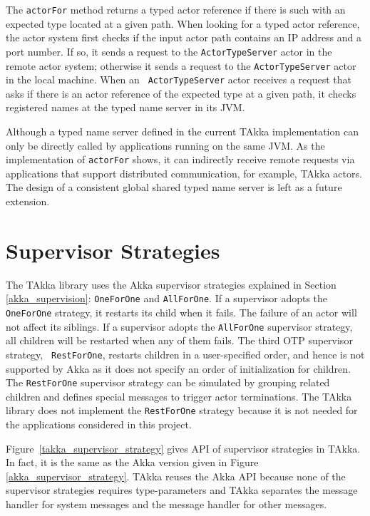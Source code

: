The {\tt actorFor} method returns a typed actor reference if there is such with 
an expected type located at a given path.  When looking for a typed 
actor reference, the actor system first checks if the input actor path 
contains an IP address and a port number.  If so, it sends a request to the 
{\tt ActorTypeServer} actor in the remote actor system; otherwise it sends a 
request to the {\tt ActorTypeServer} actor in the local machine.  When an {\tt 
ActorTypeServer} actor receives a request that asks if there is an actor 
reference of the expected type at a given path,
it checks registered names at the typed name server in its JVM.  


Although a typed name server defined in the current TAkka implementation can 
only be directly called by applications running on the same JVM.  As the 
implementation of {\tt actorFor} shows, it can indirectly receive remote 
requests via applications that support distributed communication, for example, 
TAkka actors.  The design of a consistent global shared typed name server is 
left as a future extension.



\section{Supervisor Strategies}
\label{supervision}

The TAkka library uses the Akka supervisor strategies explained in Section 
\ref{akka_supervision}: {\tt OneForOne} and {\tt AllForOne}.  If a supervisor 
adopts the {\tt OneForOne} strategy, it restarts its child when it fails.  
The failure of an actor will not affect its siblings.  If a supervisor adopts 
the {\tt AllForOne} supervisor strategy, all children will 
be restarted when any of them fails.  The third OTP supervisor strategy, {\tt
RestForOne}, restarts children in a user-specified order, and hence is not
supported by Akka as it does not specify an order of initialization for
children.  The {\tt RestForOne} supervisor strategy can be simulated by 
grouping related children and defines special messages to trigger actor 
terminations.  The TAkka library does not implement the {\tt RestForOne} 
strategy because it is not needed for the applications considered in this 
project.

Figure~\ref{takka_supervisor_strategy} gives API of supervisor strategies in 
TAkka.  In fact, it is the same as the Akka version given in Figure 
\ref{akka_supervisor_strategy}.  TAkka reuses the Akka API because none of the 
supervisor strategies requires type-parameters and TAkka separates 
the message handler for system messages and the message handler for other 
messages.




